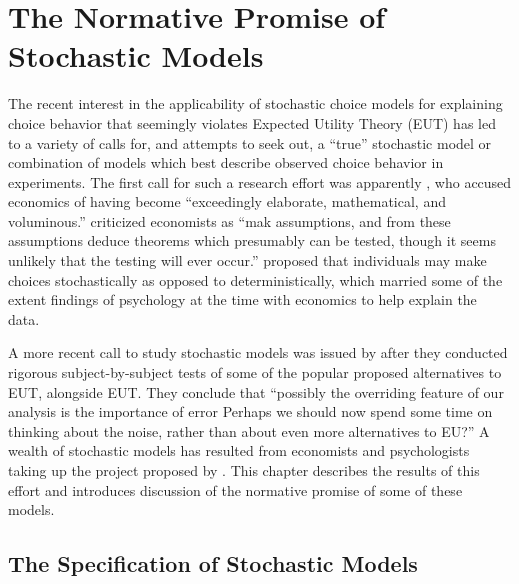 \documentclass[../main.tex]{subfiles}
\begin{document}
\doublespacing
\setcounter{chapter}{1}
\singlespacing
\chapter{The Normative Promise of Stochastic Models}
\doublespacing

\lltoc

The recent interest in the applicability of stochastic choice models for explaining choice behavior that seemingly violates Expected Utility Theory (EUT) has led to a variety of calls for, and attempts to seek out, a \enquote{true} stochastic model or combination of  models which best describe observed choice behavior in experiments.
The first call for such a research effort was apparently \textcite{Edwards1954}, who accused economics of having become \enquote{exceedingly elaborate, mathematical, and voluminous.}
\textcite[380]{Edwards1954} criticized economists as \enquote{mak assumptions, and from these assumptions \textelp{} deduce theorems which presumably can be tested, though it seems unlikely that the testing will ever occur.}
\textcite{Edwards1954} proposed that individuals may make choices stochastically as opposed to deterministically, which married some of the extent findings of psychology at the time with economics to help explain the data.

A more recent call to study stochastic models was issued by \textcite[1321]{Hey1994} after they conducted rigorous subject-by-subject tests of some of the popular proposed alternatives to EUT, alongside EUT.
They conclude that \enquote{possibly the overriding feature of our analysis is the importance of error \textelp{} Perhaps we should now spend some time on thinking about the noise, rather than about even more alternatives to EU?}
A wealth of stochastic models has resulted from economists and psychologists taking up the project proposed by \textcite{Hey1994}.
This chapter describes the results of this effort and introduces discussion of the normative promise of some of these models.

\singlespacing
\section{The Specification of Stochastic Models}
\doublespacing
\end{document}
